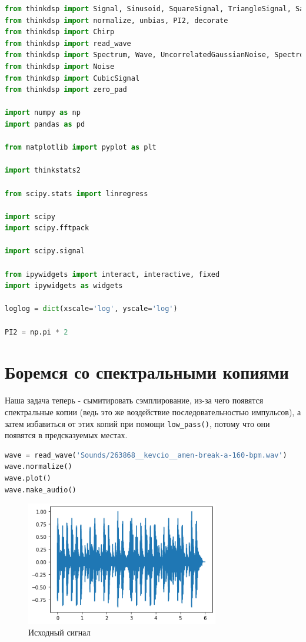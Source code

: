 \documentclass[a4paper,12pt]{report}
\begin{document}
\begin{lstlisting}[language=Python,caption=Импорты]
from thinkdsp import Signal, Sinusoid, SquareSignal, TriangleSignal, SawtoothSignal, ParabolicSignal
from thinkdsp import normalize, unbias, PI2, decorate
from thinkdsp import Chirp
from thinkdsp import read_wave
from thinkdsp import Spectrum, Wave, UncorrelatedGaussianNoise, Spectrogram
from thinkdsp import Noise
from thinkdsp import CubicSignal
from thinkdsp import zero_pad

import numpy as np
import pandas as pd

from matplotlib import pyplot as plt

import thinkstats2

from scipy.stats import linregress

import scipy
import scipy.fftpack

import scipy.signal

from ipywidgets import interact, interactive, fixed
import ipywidgets as widgets

loglog = dict(xscale='log', yscale='log')

PI2 = np.pi * 2
\end{lstlisting}

    \chapter{Боремся со спектральными копиями}
    
    Наша задача теперь - сымитировать сэмплирование, из-за чего появятся спектральные копии (ведь это же воздействие последовательностью импульсов), а затем избавиться от этих копий при помощи \texttt{low\_pass()}, потому что они появятся в предсказуемых местах.

\begin{lstlisting}[language=Python,caption=Ударные]
wave = read_wave('Sounds/263868__kevcio__amen-break-a-160-bpm.wav')
wave.normalize()
wave.plot()
wave.make_audio()
\end{lstlisting}

    \begin{figure}[H]
        \centering
        \includegraphics[width=0.75\textwidth]{images/ex2_drums.png}
        \caption{Исходный сигнал}
        \label{fig:ex2_drums}
    \end{figure}
    
\end{document}

